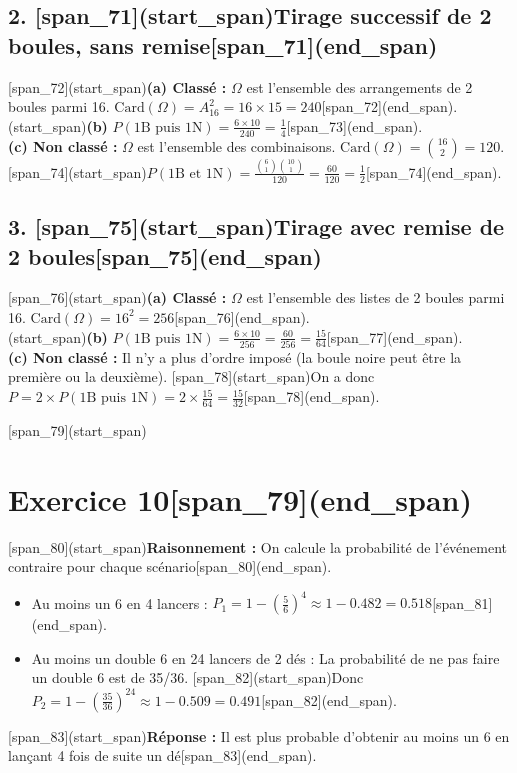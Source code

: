 \documentclass[11pt,a4paper]{article}
\begin{document}
\subsection*{2. [span_71](start_span)Tirage successif de 2 boules, sans remise[span_71](end_span)}
[span_72](start_span)\textbf{(a) Classé :} $\Omega$ est l'ensemble des arrangements de 2 boules parmi 16. $\text{Card}(\Omega) = A_{16}^2 = 16 \times 15 = 240$[span_72](end_span).\\
[span_73](start_span)\textbf{(b)} $P(\text{1B puis 1N}) = \frac{6 \times 10}{240} = \frac{1}{4}$[span_73](end_span).\\
\textbf{(c) Non classé :} $\Omega$ est l'ensemble des combinaisons. $\text{Card}(\Omega) = \binom{16}{2} = 120$. [span_74](start_span)$P(\text{1B et 1N}) = \frac{\binom{6}{1} \binom{10}{1}}{120} = \frac{60}{120} = \frac{1}{2}$[span_74](end_span).

\subsection*{3. [span_75](start_span)Tirage avec remise de 2 boules[span_75](end_span)}
[span_76](start_span)\textbf{(a) Classé :} $\Omega$ est l'ensemble des listes de 2 boules parmi 16. $\text{Card}(\Omega) = 16^2 = 256$[span_76](end_span).\\
[span_77](start_span)\textbf{(b)} $P(\text{1B puis 1N}) = \frac{6 \times 10}{256} = \frac{60}{256} = \frac{15}{64}$[span_77](end_span).\\
\textbf{(c) Non classé :} Il n'y a plus d'ordre imposé (la boule noire peut être la première ou la deuxième). [span_78](start_span)On a donc $P = 2 \times P(\text{1B puis 1N}) = 2 \times \frac{15}{64} = \frac{15}{32}$[span_78](end_span).

\hrulefill

[span_79](start_span)\section*{Exercice 10[span_79](end_span)}
[span_80](start_span)\textbf{Raisonnement :} On calcule la probabilité de l'événement contraire pour chaque scénario[span_80](end_span).
\begin{itemize}
    [span_81](start_span)\item Au moins un 6 en 4 lancers : $P_1 = 1 - \left(\frac{5}{6}\right)^4 \approx 1 - 0.482 = 0.518$[span_81](end_span).
    \item Au moins un double 6 en 24 lancers de 2 dés : La probabilité de ne pas faire un double 6 est de 35/36. [span_82](start_span)Donc $P_2 = 1 - \left(\frac{35}{36}\right)^{24} \approx 1 - 0.509 = 0.491$[span_82](end_span).
\end{itemize}
[span_83](start_span)\textbf{Réponse :} Il est plus probable d'obtenir au moins un 6 en lançant 4 fois de suite un dé[span_83](end_span).
\end{document}
